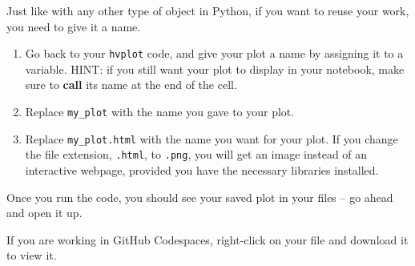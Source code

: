 \documentclass[
  letterpaper,
  DIV=11,
  numbers=noendperiod,
  oneside]{scrreprt}
\providecommand{\tightlist}{%
  \setlength{\itemsep}{0pt}\setlength{\parskip}{0pt}}
\begin{document}
\begin{tcolorbox}[enhanced jigsaw, colbacktitle=quarto-callout-color!10!white, opacityback=0, bottomtitle=1mm, toptitle=1mm, bottomrule=.15mm, left=2mm, colframe=quarto-callout-color-frame, leftrule=.75mm, opacitybacktitle=0.6, colback=white, rightrule=.15mm, toprule=.15mm, breakable, titlerule=0mm, title=\textcolor{quarto-callout-color}{\faInfo}\hspace{0.5em}{Try It: Save Your Plot}, coltitle=black, arc=.35mm]

Just like with any other type of object in Python, if you want to reuse
your work, you need to give it a name.

\begin{enumerate}
\def\labelenumi{\arabic{enumi}.}
\tightlist
\item
  Go back to your \texttt{hvplot} code, and give your plot a name by
  assigning it to a variable. HINT: if you still want your plot to
  display in your notebook, make sure to \textbf{call} its name at the
  end of the cell.
\item
  Replace \texttt{my\_plot} with the name you gave to your plot.
\item
  Replace \texttt{\textquotesingle{}my\_plot.html\textquotesingle{}}
  with the name you want for your plot. If you change the file
  extension, \texttt{.html}, to \texttt{.png}, you will get an image
  instead of an interactive webpage, provided you have the necessary
  libraries installed.
\end{enumerate}

Once you run the code, you should see your saved plot in your files --
go ahead and open it up.

\end{tcolorbox}

\begin{tcolorbox}[enhanced jigsaw, colbacktitle=quarto-callout-warning-color!10!white, opacityback=0, bottomtitle=1mm, toptitle=1mm, bottomrule=.15mm, left=2mm, colframe=quarto-callout-warning-color-frame, leftrule=.75mm, opacitybacktitle=0.6, colback=white, rightrule=.15mm, toprule=.15mm, breakable, titlerule=0mm, title=\textcolor{quarto-callout-warning-color}{\faExclamationTriangle}\hspace{0.5em}{Warning}, coltitle=black, arc=.35mm]

If you are working in GitHub Codespaces, right-click on your file and
download it to view it.

\end{tcolorbox}
\end{document}

